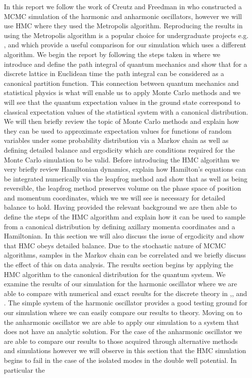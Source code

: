 \documentclass[12pt]{article}
\begin{document}
 In this report we follow the work of Creutz and Freedman in \cite{creutz_freedman_1981} who constructed a MCMC simulation of the harmonic and anharmonic oscillators, however we will use HMC where they used the Metropolis algorithm. Reproducing the results in \cite{creutz_freedman_1981} using the Metropolis algorithm is a popular choice for undergraduate projects e.g. \cite{westbroek_king_vvedensky_durr_2017}, \cite{rodgers_raes} and \cite{slapik_serenone} which provide a useful comparison for our simulation which uses a different algorithm. We begin the report by following the steps taken in \cite{creutz_freedman_1981} where we introduce and define the path integral of quantum mechanics and show that for a discrete lattice in Euclidean time the path integral can be considered as a canonical partition function. This connection between quantum mechanics and statistical physics is what will enable us to apply Monte Carlo methods and we will see that the quantum expectation values in the ground state correspond to classical expectation values of the statistical system with a canonical distribution. We will then briefly review the topic of Monte Carlo methods and explain how they can be used to approximate expectation values for functions of random variables under some probability distribution via a Markov chain as well as defining detailed balance and ergodicity which are conditions required for the Monte Carlo simulation to be valid. Before introducing the HMC algorithm we very briefly review Hamiltonian dynamics, explain how Hamilton's equations can be integrated numerically via the leapfrog method and show that as well as being reversible, the leapfrog method preserves volume on the phase space of position and momentum coordinates, which we we will see is necessary for detailed balance to hold. Having provided the relevant background we are then able to define the steps of the HMC algorithm and explain how it can be used to sample from a canonical distribution by defining axillary momenta coordinates and a Hamiltonian. In this section we will also discuss the issue of ergodicity and show that HMC obeys detailed balance. Due to the stochastic nature of MCMC algorithms, samples in the Markov chain can be correlated and we briefly discuss the effect of this on data analysis. The results section begins by applying the HMC algorithm to the canonical distribution for the quantum system. We examine the results of our simulation for the harmonic oscillator where we are able to compare with numerical and exact results for the discrete theory in \cite{creutz_freedman_1981},\cite{westbroek_king_vvedensky_durr_2017}, \cite{rodgers_raes} and \cite{slapik_serenone}. The simple system of the harmonic oscillator provides a good testing ground for our simulation where we can easily compare our results to theory. Moving on to the anharmonic oscillator we are able to apply our simulation to a system that does not have an analytic solution. For the case of the anharmonic oscillator we are able to compare our results to those acquired through alternative methods \cite{blankenbecler_degrand_sugar_1980} and simulations \cite{rodgers_raes} however we will observe in this section that the HMC simulation begins to fail in the case of the isolated modes in the double well potential. In particular the 
\end{document}
